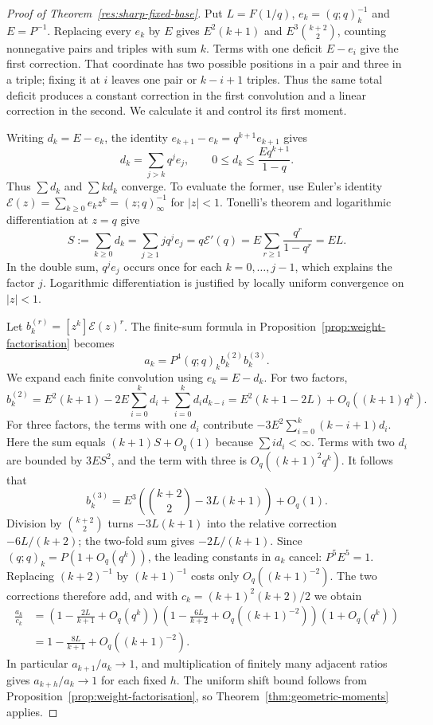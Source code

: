 \documentclass[11pt]{article}
\begin{document}
\begin{proof}[Proof of Theorem~\ref{res:sharp-fixed-base}]
Put $L=F(1/q)$, $e_k=(q;q)_k^{-1}$ and $E=P^{-1}$.
Replacing every $e_k$ by $E$ gives $E^2(k+1)$ and
$E^3\binom{k+2}{2}$, counting nonnegative pairs and triples with
sum $k$. Terms with one deficit $E-e_i$ give the first correction.
That coordinate has two possible positions in a
pair and three in a triple; fixing it at $i$ leaves one pair or
$k-i+1$ triples. Thus the same total deficit produces a constant
correction in the first convolution and a linear correction in the
second. We calculate it and control its first moment.

Writing $d_k=E-e_k$, the identity
$e_{k+1}-e_k=q^{k+1}e_{k+1}$ gives
\[
 d_k=\sum_{j>k}q^je_j,\qquad
 0\le d_k\le\frac{E q^{k+1}}{1-q}.
\]
Thus $\sum d_k$ and $\sum k d_k$ converge. To evaluate the former,
use Euler's identity
$\mathcal E(z)=\sum_{k\ge0}e_kz^k=(z;q)_\infty^{-1}$ for $|z|<1$.
Tonelli's theorem and logarithmic differentiation at $z=q$ give
\[
 S:=\sum_{k\ge0}d_k
 =\sum_{j\ge1}j q^je_j
 =q\mathcal E'(q)
 =E\sum_{r\ge1}\frac{q^r}{1-q^r}=EL.
\]
In the double sum, $q^je_j$ occurs once for each $k=0,\ldots,j-1$,
which explains the factor $j$. Logarithmic differentiation is
justified by locally uniform convergence on $|z|<1$.

Let $b_k^{(r)}=[z^k]\mathcal E(z)^r$. The finite-sum formula in
Proposition~\ref{prop:weight-factorisation} becomes
\[
 a_k=P^4(q;q)_k b_k^{(2)}b_k^{(3)}.
\]
We expand each finite convolution using $e_k=E-d_k$. For two factors,
\[
 b_k^{(2)}=E^2(k+1)-2E\sum_{i=0}^k d_i
              +\sum_{i=0}^k d_i d_{k-i}
 =E^2(k+1-2L)+O_q((k+1)q^k).
\]
For three factors, the terms with one $d_i$ contribute
$-3E^2\sum_{i=0}^k(k-i+1)d_i$.
Here the sum equals $(k+1)S+O_q(1)$ because
$\sum i d_i<\infty$. Terms with two $d_i$ are bounded by
$3E S^2$, and the term with three is $O_q((k+1)^2q^k)$.
It follows that
\[
 b_k^{(3)}=E^3\left(\binom{k+2}{2}-3L(k+1)\right)+O_q(1).
\]
Division by $\binom{k+2}{2}$ turns $-3L(k+1)$ into the relative
correction $-6L/(k+2)$; the two-fold sum gives $-2L/(k+1)$.
Since $(q;q)_k=P(1+O_q(q^k))$, the leading constants in $a_k$
cancel: $P^5E^5=1$. Replacing $(k+2)^{-1}$ by $(k+1)^{-1}$ costs
only $O_q((k+1)^{-2})$. The two corrections therefore add, and
with $c_k=(k+1)^2(k+2)/2$ we obtain
\begin{align*}
 \frac{a_k}{c_k}
 &=\left(1-\frac{2L}{k+1}+O_q(q^k)\right)
   \left(1-\frac{6L}{k+2}+O_q((k+1)^{-2})\right)
   \left(1+O_q(q^k)\right)\\
 &=1-\frac{8L}{k+1}+O_q((k+1)^{-2}).
\end{align*}
In particular $a_{k+1}/a_k\to1$, and multiplication of finitely
many adjacent ratios gives $a_{k+h}/a_k\to1$ for each fixed $h$.
The uniform shift bound follows from
Proposition~\ref{prop:weight-factorisation}, so
Theorem~\ref{thm:geometric-moments} applies.


\end{proof}
\end{document}
